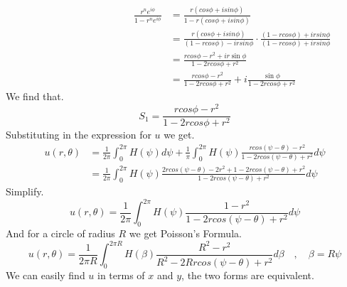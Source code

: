 \documentclass[]{article}
\begin{document}
\newpage
\begin{align*}
\hspace{4cm}
\frac{r^n e^{i\phi}}{1- r^n e^{i\phi}} &= \frac{r(cos\phi+isin\phi)}{1-r(cos\phi+isin\phi)}
\\
&= \frac{r(cos\phi+isin\phi)}{(1-rcos\phi)-irsin\phi} \cdot \frac{(1-rcos\phi)+irsin\phi}{(1-rcos\phi)+irsin\phi}
\\
&= \frac{rcos\phi - r^2 + ir \sin\phi}{1-2rcos\phi+r^2}
\\
&= \frac{rcos\phi - r^2}{1-2rcos\phi+r^2} + i \frac{\sin\phi}{1-2rcos\phi+r^2}
\end{align*}
We find that.
\[
    S_1 = \frac{rcos\phi - r^2}{1-2rcos\phi+r^2}    
\]
Substituting in the expression for $u$ we get.
\begin{align*}
u(r,\theta) &= \frac{1}{2\pi}\int_{0}^{2\pi} H(\psi ) d\psi  + \frac{1}{\pi}\int_{0}^{2\pi} H(\psi )\frac{rcos(\psi  -\theta) - r^2}{1-2rcos(\psi  -\theta)+r^2}d\psi 
\\
            &= \frac{1}{2\pi}\int_{0}^{2\pi} H(\psi )\frac{2rcos(\psi  -\theta) - 2r^2+1-2rcos(\psi  -\theta)+r^2}{1-2rcos(\psi  -\theta)+r^2}d\psi 
\end{align*}
Simplify.
\[
    u(r,\theta) = \frac{1}{2\pi}\int_{0}^{2\pi} H(\psi )\frac{1-r^2}{1-2rcos(\psi  -\theta)+r^2}d\psi     
\]
And for a circle of radius $R$ we get Poisson's Formula.
\[
    u(r,\theta) = \frac{1}{2\pi R}\int_{0}^{2\pi R} H(\beta)\frac{R^2-r^2}{R^2-2Rrcos(\psi  -\theta)+r^2}d\beta \quad, \quad \beta = R\psi     
\]
We can easily find $u$ in terms of $x$ and $y$, the two forms are equivalent.
\end{document}
